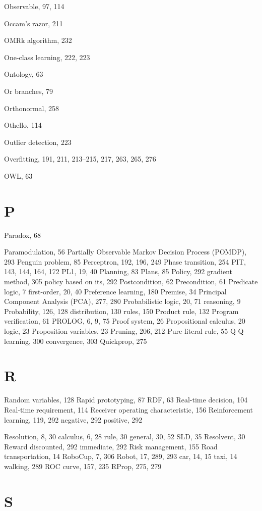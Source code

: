 \documentclass[10pt]{book}
\begin{document}
Observable, 97, 114

Occam's razor, 211

OMRk algorithm, 232

One-class learning, 222, 223

Ontology, 63

Or branches, 79

Orthonormal, 258

Othello, 114

Outlier detection, 223

Overfitting, 191, 211, 213--215, 217, 263, 265, 276

OWL, 63

\section{P}

Paradox, 68

Paramodulation, 56
Partially Observable Markov Decision Process (POMDP), 293
Penguin problem, 85
Perceptron, 192, 196, 249
Phase transition, 254
PIT, 143, 144, 164, 172
PL1, 19, 40
Planning, 83
Plans, 85
Policy, 292
gradient method, 305
policy based on its, 292
Postcondition, 62
Precondition, 61
Predicate logic, 7
first-order, 20, 40
Preference learning, 180
Premise, 34
Principal Component Analysis (PCA), 277, 280
Probabilistic
logic, 20, 71
reasoning, 9
Probability, 126, 128
distribution, 130
rules, 150
Product rule, 132
Program verification, 61
PROLOG, 6, 9, 75
Proof system, 26
Propositional
calculus, 20
logic, 23
Proposition variables, 23
Pruning, 206, 212
Pure literal rule, 55
Q
Q-learning, 300
convergence, 303
Quickprop, 275

\section{R}

Random variables, 128
Rapid prototyping, 87
RDF, 63
Real-time decision, 104
Real-time requirement, 114
Receiver operating characteristic, 156
Reinforcement
learning, 119, 292
negative, 292
positive, 292

Resolution, 8, 30
calculus, 6, 28
rule, 30
general, 30, 52
SLD, 35
Resolvent, 30
Reward
discounted, 292
immediate, 292
Risk management, 155
Road transportation, 14
RoboCup, 7, 306
Robot, 17, 289, 293
car, 14, 15
taxi, 14
walking, 289
ROC curve, 157, 235
RProp, 275, 279

\section{S}
\end{document}
